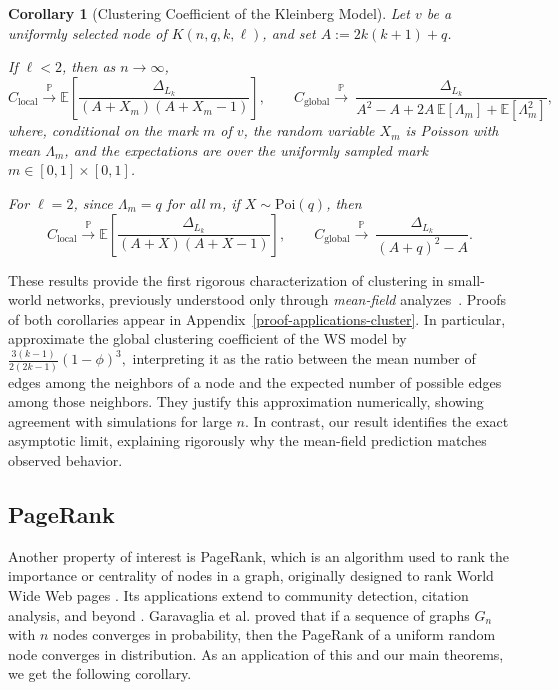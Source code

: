\documentclass[10pt]{amsart}
\newtheorem{corollary}[theorem]{Corollary}
\begin{document}
\begin{corollary}[Clustering Coefficient of the Kleinberg Model] \label{cor2}
Let \(v\) be a uniformly selected node of \(K(n,q,k,\ell)\), and set \(A:=2k(k+1)+q\).

If \(\ell<2\), then as \(n\to\infty\),
\[C_{\mathrm{local}} \xrightarrow{\mathbb P}
\mathbb{E}\!\left[\frac{\Delta_{L_k}}{(A+X_m)(A+X_m-1)}\right], \qquad C_{\mathrm{global}}\xrightarrow{\mathbb P}\ \frac{\Delta_{L_k}}{A^2 - A + 2A\,\mathbb E[\Lambda_m] + \mathbb E[\Lambda_m^2]},
\]
where, conditional on the mark \(m\) of \(v\), the random variable \(X_m\) is Poisson with mean \(\Lambda_m\), and the expectations are over the uniformly sampled mark \(m\in [0,1]\times[0,1]\).

For \(\ell=2\), since \(\Lambda_m=q\) for all \(m\), if \(X\sim \mathrm{Poi}(q)\), then
\[
C_{\mathrm{local}} \xrightarrow{\mathbb P}
\mathbb{E}\!\left[\frac{\Delta_{L_k}}{(A+X)(A+X-1)}\right], \qquad C_{\mathrm{global}}\xrightarrow{\mathbb P}\ \frac{\Delta_{L_k}}{(A+q)^2-A}.
\]
\end{corollary}

These results provide the first rigorous characterization of clustering in small-world networks, previously understood only through \emph{mean-field} analyzes~\cite{barrat2000properties}. Proofs of both corollaries appear in Appendix~\ref{proof-applications-cluster}. In particular, \cite{barrat2000properties} approximate the global clustering coefficient of the WS model by
$\frac{3(k-1)}{2(2k-1)}(1-\phi)^3,$
interpreting it as the ratio between the mean number of edges among the neighbors of a node and the expected number of possible edges among those neighbors. They justify this approximation numerically, showing agreement with simulations for large \(n\). In contrast, our result identifies the exact asymptotic limit, explaining rigorously why the mean-field prediction matches observed behavior.


\subsection{PageRank}
Another property of interest is PageRank, which is an algorithm used to rank the importance or centrality of nodes in a graph, originally designed to rank World Wide Web pages  \cite{page1999pagerank}. Its applications extend to community detection, citation analysis, and beyond \cite{page1999pagerank}. Garavaglia et al. \cite{garavaglia2018local} proved that if a sequence of graphs $G_n$ with $n$ nodes converges in probability, then the PageRank of a uniform random node converges in distribution. As an application of this and our main theorems, we get the following corollary.
\end{document}
